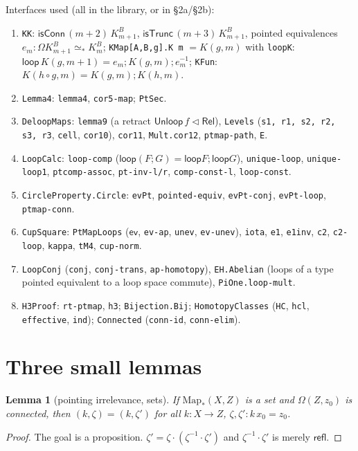 \documentclass[11pt]{amsart}
\newtheorem{lemma}[theorem]{Lemma}
\theoremstyle{definition}
\theoremstyle{remark}
\newcommand{\Om}{\Omega}
\newcommand{\Map}{\mathrm{Map}_*}
\newcommand{\code}[1]{\texttt{#1}}
\newcommand{\cT}{\mathsf{isTrunc}}
\newcommand{\cC}{\mathsf{isConn}}
\newcommand{\refl}{\mathsf{refl}}
\newcommand{\ev}{\mathsf{ev}}
\newcommand{\lp}{\mathsf{loop}}
\newcommand{\Unl}{\mathsf{Unloop}}
\begin{document}
Interfaces used (all in the library, or in \S2a/\S2b):
\begin{enumerate}
\item[(I1)] \code{KK}: $\cC\,(m+2)\,K^B_{m+1}$, $\cT\,(m+3)\,K^B_{m+1}$,
  pointed equivalences $e_m:\Om K^B_{m+1}\simeq_*K^B_m$; \code{KMap[A,B,g].K m}
  $=K(g,m)$ with \code{loopK}: $\lp\,K(g,m+1)=e_m;K(g,m);e_m^{-1}$;
  \code{KFun}: $K(h\circ g,m)=K(g,m);K(h,m)$.
\item[(I2)] \code{Lemma4}: \code{lemma4}, \code{cor5-map}; \code{PtSec}.
\item[(I3)] \code{DeloopMaps}: \code{lemma9} (a retract
  $\Unl\,f\lhd\mathsf{Rel}$), \code{Levels} (\code{s1, r1, s2, r2, s3, r3},
  \code{cell}, \code{cor10}), \code{cor11}, \code{Mult.cor12},
  \code{ptmap-path}, \code{E}.
\item[(I4)] \code{LoopCalc}: \code{loop-comp}
  ($\lp(F;G)=\lp F;\lp G$), \code{unique-loop}, \code{unique-loop1},
  \code{ptcomp-assoc}, \code{pt-inv-l/r}, \code{comp-const-l},
  \code{loop-const}.
\item[(I5)] \code{CircleProperty.Circle}: \code{evPt}, \code{pointed-equiv},
  \code{evPt-conj}, \code{evPt-loop}, \code{ptmap-conn}.
\item[(I6)] \code{CupSquare}: \code{PtMapLoops} ($\ev$, \code{ev-ap},
  \code{unev}, \code{ev-unev}), \code{iota}, \code{e1}, \code{e1inv},
  \code{c2}, \code{c2-loop}, \code{kappa}, \code{tM4}, \code{cup-norm}.
\item[(I7)] \code{LoopConj} (\code{conj}, \code{conj-trans},
  \code{ap-homotopy}), \code{EH.Abelian} (loops of a type pointed
  equivalent to a loop space commute), \code{PiOne.loop-mult}.
\item[(I8)] \code{H3Proof}: \code{rt-ptmap}, \code{h3}; \code{Bijection.Bij};
  \code{HomotopyClasses} (\code{HC}, \code{hcl}, \code{effective},
  \code{ind}); \code{Connected} (\code{conn-id}, \code{conn-elim}).
\end{enumerate}

\section{Three small lemmas}

\begin{lemma}[pointing irrelevance, sets]\label{l:pi-set}
If $\Map(X,Z)$ is a set and $\Om(Z,z_0)$ is connected, then
$(k,\zeta)=(k,\zeta')$ for all $k:X\to Z$, $\zeta,\zeta':k\,x_0=z_0$.
\end{lemma}
\begin{proof}
The goal is a proposition. $\zeta'=\zeta\cdot(\zeta^{-1}\cdot\zeta')$ and
$\zeta^{-1}\cdot\zeta'$ is merely $\refl$.
\end{proof}
\end{document}
